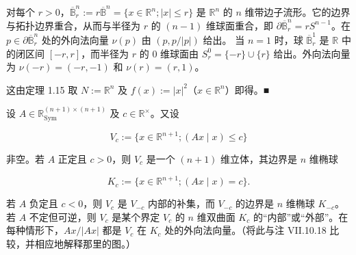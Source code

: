 \begin{example}

\begin{items}
\item

对每个 $ r > 0 $，$ \overline{\mathbb{B}}_{r}^{n} := r\overline{\mathbb{B}}^{n} = \{x \in \mathbb{R}^{n} ; |x| \le r\} $ 是 $ \mathbb{R}^{n} $ 的 $ n $ 维带边子流形。它的边界与拓扑边界重合，从而与半径为 $ r $ 的 $ (n-1) $ 维球面重合，即 $ \partial\overline{\mathbb{B}}_{r}^{n} = rS^{n-1} $。在 $ p \in \partial\overline{\mathbb{B}}_{r}^{n} $ 处的外向法向量 $ \nu(p) $ 由 $ (p, p/|p|) $ 给出。
当 $ n = 1 $ 时，球 $ \overline{\mathbb{B}}_{r}^{1} $ 是 $ \mathbb{R} $ 中的闭区间 $ [-r, r] $，而半径为 $ r $ 的 0 维球面由 $ S_{r}^{0} = \{-r\} \cup \{r\} $ 给出。外向法向量为 $ \nu(-r) = (-r, -1) $ 和 $ \nu(r) = (r, 1) $。

\end{items}


\proofhead
这由定理 1.15 取 $ N := \mathbb{R}^{n} $ 及 $ f(x) := |x|^{2} $（$ x \in \mathbb{R}^{n} $）即得。\nobreak\hspace{0.35em}■

\begin{items}
\item[（b）]

设 $ A \in \mathbb{R}_{\mathrm{Sym}}^{(n+1) \times (n+1)} $ 及 $ c \in \mathbb{R}^{\times} $。又设

\[
V_{c} := \{x \in \mathbb{R}^{n+1} ; (Ax \mid x) \le c\}
\]

非空。若 $ A $ 正定且 $ c > 0 $，则 $ V_{c} $ 是一个 $ (n+1) $ 维立体，其边界是 $ n $ 维椭球

\[
K_{c} := \{x \in \mathbb{R}^{n+1} ; (Ax \mid x) = c\}.
\]

若 $ A $ 负定且 $ c < 0 $，则 $ V_{c} $ 是 $ V_{-c} $ 内部的补集，而 $ V_{-c} $ 的边界是 $ n $ 维椭球 $ K_{-c} $。若 $ A $ 不定但可逆，则 $ V_{c} $ 是某个界定 $ V_{c} $ 的 $ n $ 维双曲面 $ K_{c} $ 的“内部”或“外部”。在每种情形下，$ Ax/|Ax| $ 都是 $ V_{c} $ 在 $ K_{c} $ 处的外向法向量。（将此与注 VII.10.18 比较，并相应地解释那里的图。）

\end{items}


\begin{items}
\item[（c）]


\end{items}
\end{example}
